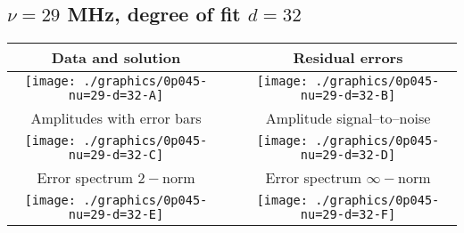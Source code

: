 

% 

\clearpage{}
\break{}

\subsection{$\nu = 29$ MHz, degree of fit $d = 32$}

\begin{table}[h]
    \begin{center}
        \begin{tabular}{ccc}
            Data and solution & \quad & Residual errors \\\hline
            \texttt{[image: ./graphics/0p045-nu=29-d=32-A]} &&
            \texttt{[image: ./graphics/0p045-nu=29-d=32-B]} \\[15pt]
            Amplitudes with error bars && Amplitude signal--to--noise \\\hline
            \texttt{[image: ./graphics/0p045-nu=29-d=32-C]} &&
            \texttt{[image: ./graphics/0p045-nu=29-d=32-D]} \\[15pt]
            Error spectrum $2-$norm && Error spectrum $\infty-$norm \\\hline
            \texttt{[image: ./graphics/0p045-nu=29-d=32-E]} &&
            \texttt{[image: ./graphics/0p045-nu=29-d=32-F]} \\[15pt]
        \end{tabular}
    \end{center}
\label{fig:elev=45, nu=29}
\end{table}



\endinput

